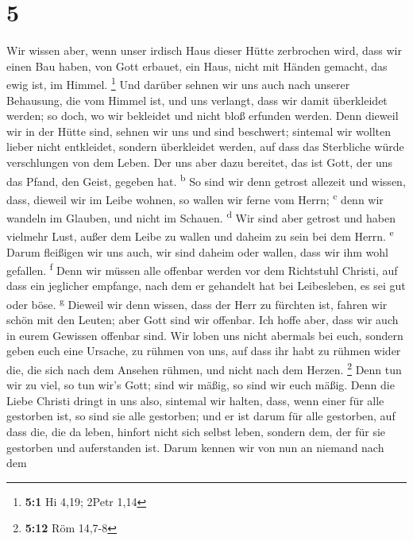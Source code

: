 \hypertarget{section-4}{%
\section{5}\label{section-4}}

 Wir wissen aber, wenn unser irdisch Haus dieser Hütte
zerbrochen wird, dass wir einen Bau haben, von Gott erbauet, ein Haus,
nicht mit Händen gemacht, das ewig ist, im Himmel. \footnote{\textbf{5:1}
  Hi 4,19; 2Petr 1,14}  Und darüber sehnen wir uns auch
nach unserer Behausung, die vom Himmel ist, und uns verlangt, dass wir
damit überkleidet werden;  so doch, wo wir bekleidet und
nicht bloß erfunden werden.  Denn dieweil wir in der Hütte
sind, sehnen wir uns und sind beschwert; sintemal wir wollten lieber
nicht entkleidet, sondern überkleidet werden, auf dass das Sterbliche
würde verschlungen von dem Leben.  Der uns aber dazu
bereitet, das ist Gott, der uns das Pfand, den Geist, gegeben hat.
\textsuperscript{b}  So sind wir denn getrost allezeit und
wissen, dass, dieweil wir im Leibe wohnen, so wallen wir ferne vom
Herrn; \textsuperscript{c}  denn wir wandeln im Glauben,
und nicht im Schauen. \textsuperscript{d}  Wir sind aber
getrost und haben vielmehr Lust, außer dem Leibe zu wallen und daheim zu
sein bei dem Herrn. \textsuperscript{e}  Darum fleißigen
wir uns auch, wir sind daheim oder wallen, dass wir ihm wohl gefallen.
\textsuperscript{f}  Denn wir müssen alle offenbar werden
vor dem Richtstuhl Christi, auf dass ein jeglicher empfange, nach dem er
gehandelt hat bei Leibesleben, es sei gut oder böse. \textsuperscript{g}
 Dieweil wir denn wissen, dass der Herr zu fürchten ist,
fahren wir schön mit den Leuten; aber Gott sind wir offenbar. Ich hoffe
aber, dass wir auch in eurem Gewissen offenbar sind.  Wir
loben uns nicht abermals bei euch, sondern geben euch eine Ursache, zu
rühmen von uns, auf dass ihr habt zu rühmen wider die, die sich nach dem
Ansehen rühmen, und nicht nach dem Herzen. \footnote{\textbf{5:12} Röm
  14,7-8}  Denn tun wir zu viel, so tun wir's Gott; sind
wir mäßig, so sind wir euch mäßig.  Denn die Liebe
Christi dringt in uns also, sintemal wir halten, dass, wenn einer für
alle gestorben ist, so sind sie alle gestorben;  und er
ist darum für alle gestorben, auf dass die, die da leben, hinfort nicht
sich selbst leben, sondern dem, der für sie gestorben und auferstanden
ist.  Darum kennen wir von nun an niemand nach dem
